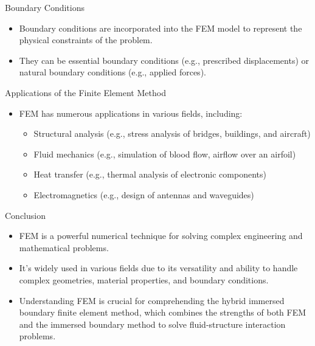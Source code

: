\documentclass{beamer}
\begin{document}
\begin{frame}{Boundary Conditions}
    \begin{itemize}
        \item Boundary conditions are incorporated into the FEM model to represent the physical constraints of the problem.
        \item They can be essential boundary conditions (e.g., prescribed displacements) or natural boundary conditions (e.g., applied forces).
    \end{itemize}
\end{frame}

\begin{frame}{Applications of the Finite Element Method}
    \begin{itemize}
        \item FEM has numerous applications in various fields, including:
        \begin{itemize}
            \item Structural analysis (e.g., stress analysis of bridges, buildings, and aircraft)
            \item Fluid mechanics (e.g., simulation of blood flow, airflow over an airfoil)
            \item Heat transfer (e.g., thermal analysis of electronic components)
            \item Electromagnetics (e.g., design of antennas and waveguides)
        \end{itemize}
    \end{itemize}
\end{frame}

\begin{frame}{Conclusion}
    \begin{itemize}
        \item FEM is a powerful numerical technique for solving complex engineering and mathematical problems.
        \item It's widely used in various fields due to its versatility and ability to handle complex geometries, material properties, and boundary conditions.
        \item Understanding FEM is crucial for comprehending the hybrid immersed boundary finite element method, which combines the strengths of both FEM and the immersed boundary method to solve fluid-structure interaction problems.
    \end{itemize}
\end{frame}
\end{document}
